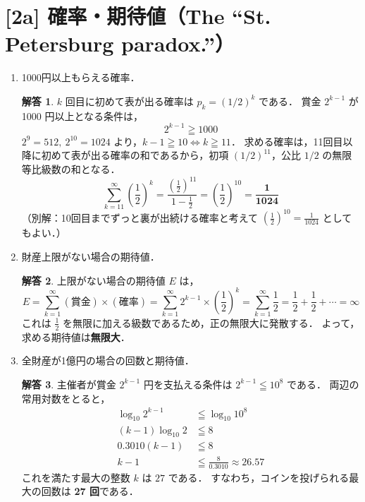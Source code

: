 \documentclass[dvipdfmx]{jlreq}
\theoremstyle{definition}
\newtheorem*{solution}{解答}
\begin{document}
\newpage

\section*{[2a] 確率・期待値（The “St. Petersburg paradox.”）}

\begin{enumerate}[label=(\arabic*)]
    \item 1000円以上もらえる確率．
    \begin{solution}
    $k$ 回目に初めて表が出る確率は $p_k = \left(1/2\right)^k$ である．
    賞金 $2^{k-1}$ が 1000 円以上となる条件は，
    \[ 2^{k-1} \geqq 1000 \]
    $2^9 = 512, \ 2^{10} = 1024$ より，$k-1 \geqq 10 \iff k \geqq 11$．
    求める確率は，11回目以降に初めて表が出る確率の和であるから，初項 $\left(1/2\right)^{11}$，公比 $1/2$ の無限等比級数の和となる．
    \[ \sum_{k=11}^{\infty} \left(\frac{1}{2}\right)^k = \frac{\left(\frac{1}{2}\right)^{11}}{1 - \frac{1}{2}} = \left(\frac{1}{2}\right)^{10} = \bm{\frac{1}{1024}} \]
    （別解：10回目までずっと裏が出続ける確率と考えて $\displaystyle\left(\frac{1}{2}\right)^{10} = \frac{1}{1024}$ としてもよい．）
    \end{solution}

    \item 財産上限がない場合の期待値．
    \begin{solution}
    上限がない場合の期待値 $E$ は，
    \[ E = \sum_{k=1}^{\infty} (\text{賞金}) \times (\text{確率}) = \sum_{k=1}^{\infty} 2^{k-1} \times \left(\frac{1}{2}\right)^k = \sum_{k=1}^{\infty} \frac{1}{2}=\frac{1}{2}+\frac{1}{2}+\cdots=\infty \]
    これは $\frac{1}{2}$ を無限に加える級数であるため，正の無限大に発散する．
    よって，求める期待値は\textbf{無限大}．
    \end{solution}

    \item 全財産が1億円の場合の回数と期待値．
    \begin{solution}
    主催者が賞金 $2^{k-1}$ 円を支払える条件は $2^{k-1} \leqq 10^8$ である．
    両辺の常用対数をとると，
    \begin{align*}
        \log_{10} 2^{k-1} &\leqq \log_{10} 10^8 \\
        (k-1) \log_{10} 2 &\leqq 8 \\
        0.3010 (k-1) &\leqq 8 \\
        k-1 &\leqq \frac{8}{0.3010} \approx 26.57
    \end{align*}
    これを満たす最大の整数 $k$ は $27$ である．
    すなわち，コインを投げられる最大の回数は \textbf{27 回}である．
    

\end{solution}
\end{enumerate}
\end{document}
